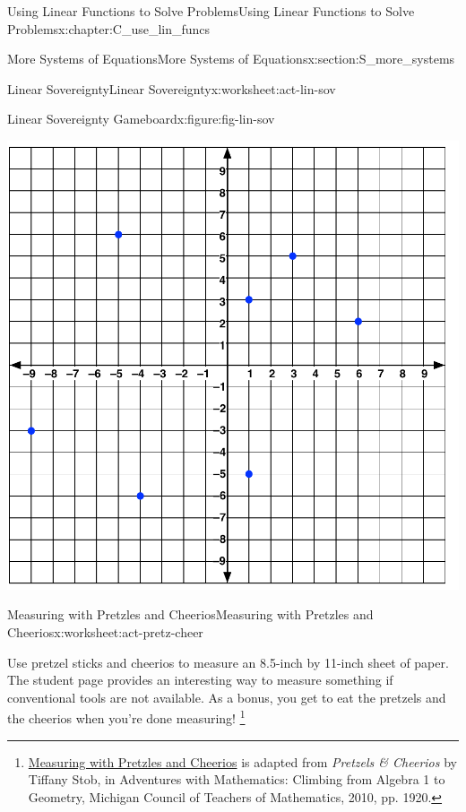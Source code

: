 \documentclass[oneside,10pt,]{book}
\newcommand{\pubtitle}[1]{\textsl{#1}}
\numberwithin{equation}{chapter}
\begin{document}
\begin{chapterptx}{Using Linear Functions to Solve Problems}{}{Using Linear Functions to Solve Problems}{}{}{x:chapter:C_use_lin_funcs}
\begin{sectionptx}{More Systems of Equations}{}{More Systems of Equations}{}{}{x:section:S_more_systems}
\begin{worksheet-subsection}{Linear Sovereignty}{}{Linear Sovereignty}{}{}{x:worksheet:act-lin-sov}
\begin{figureptx}{Linear Sovereignty Gameboard}{x:figure:fig-lin-sov}{}
\begin{image}{0}{1}{0}
\includegraphics[width=\linewidth]{external/lin-sov.pdf}
\end{image}%
\tcblower
\end{figureptx}%
\end{worksheet-subsection}
\restoregeometry
%
%
\typeout{************************************************}
\typeout{************************************************}
%
\begin{worksheet-subsection}{Measuring with Pretzles and Cheerios}{}{Measuring with Pretzles and Cheerios}{}{}{x:worksheet:act-pretz-cheer}
\begin{introduction}{}%
Use pretzel sticks and cheerios to measure an 8.5-inch by 11-inch sheet of paper. The student page provides an interesting way to measure something if conventional tools are not available. As a bonus, you get to eat the pretzels and the cheerios when you're done measuring! \footnote{\hyperref[x:worksheet:act-pretz-cheer]{Measuring with Pretzles and Cheerios} is adapted from \pubtitle{Pretzels \& Cheerios} by Tiffany Stob, in Adventures with Mathematics: Climbing from Algebra 1 to Geometry, Michigan Council of Teachers of Mathematics, 2010, pp. 19\textemdash{}20.\label{g:fn:idp1875218280}}%
\end{introduction}%

\end{worksheet-subsection}
\end{sectionptx}
\end{chapterptx}
\end{document}
